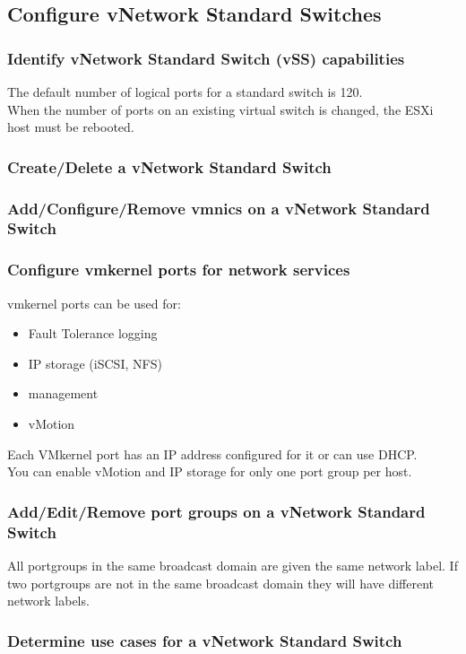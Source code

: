 \subsection{Configure vNetwork Standard Switches}

\subsubsection{Identify vNetwork Standard Switch (vSS) capabilities}

The default number of logical ports for a standard switch is 120.\\

When the number of ports on an existing virtual switch is changed, the ESXi
host must be rebooted.

\subsubsection{Create/Delete a vNetwork Standard Switch}

\subsubsection{Add/Configure/Remove vmnics on a vNetwork Standard Switch}

\subsubsection{Configure vmkernel ports for network services}

vmkernel ports can be used for:

\begin{itemize}
\item Fault Tolerance logging
\item IP storage (iSCSI, NFS)
\item management
\item vMotion
\end{itemize}

Each VMkernel port has an IP address configured for it or can use DHCP.\\

You can enable vMotion and IP storage for only one port group per host.

\subsubsection{Add/Edit/Remove port groups on a vNetwork Standard Switch}

All portgroups in the same broadcast domain are given the same network label.
If two portgroups are not in the same broadcast domain they will have different
network labels.

\subsubsection{Determine use cases for a vNetwork Standard Switch}
